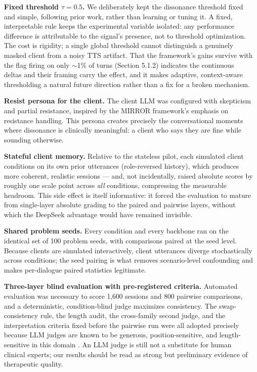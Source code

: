 \textbf{Fixed threshold $\tau = 0.5$.} We deliberately kept the dissonance threshold fixed and simple, following prior work, rather than learning or tuning it. A fixed, interpretable rule keeps the experimental variable isolated: any performance difference is attributable to the signal's presence, not to threshold optimization. The cost is rigidity; a single global threshold cannot distinguish a genuinely masked client from a noisy TTS artifact. That the framework's gains survive with the flag firing on only $\sim$1\% of turns (Section 5.1.2) indicates the continuous deltas and their framing carry the effect, and it makes adaptive, context-aware thresholding a natural future direction rather than a fix for a broken mechanism.

\textbf{Resist persona for the client.} The client LLM was configured with skepticism and partial resistance, inspired by the MIRROR framework's emphasis on resistance handling. This persona creates precisely the conversational moments where dissonance is clinically meaningful: a client who says they are fine while sounding otherwise.

\textbf{Stateful client memory.} Relative to the stateless pilot, each simulated client conditions on its own prior utterances (role-reversed history), which produces more coherent, realistic sessions --- and, not incidentally, raised absolute scores by roughly one scale point across \emph{all} conditions, compressing the measurable headroom. This side effect is itself informative: it forced the evaluation to mature from single-layer absolute grading to the paired and pairwise layers, without which the DeepSeek advantage would have remained invisible.

\textbf{Shared problem seeds.} Every condition and every backbone ran on the identical set of 100 problem seeds, with comparisons paired at the seed level. Because clients are simulated interactively, client utterances diverge stochastically across conditions; the seed pairing is what removes scenario-level confounding and makes per-dialogue paired statistics legitimate.

\textbf{Three-layer blind evaluation with pre-registered criteria.} Automated evaluation was necessary to score 1,600 sessions and 800 pairwise comparisons, and a deterministic, condition-blind judge maximizes consistency. The swap-consistency rule, the length audit, the cross-family second judge, and the interpretation criteria fixed before the pairwise run were all adopted precisely because LLM judges are known to be generous, position-sensitive, and length-sensitive in this domain \cite{haydarov-etal-2025-towards,zheng2023judging,kim-etal-2025-mirror}. An LLM judge is still not a substitute for human clinical experts; our results should be read as strong but preliminary evidence of therapeutic quality.

